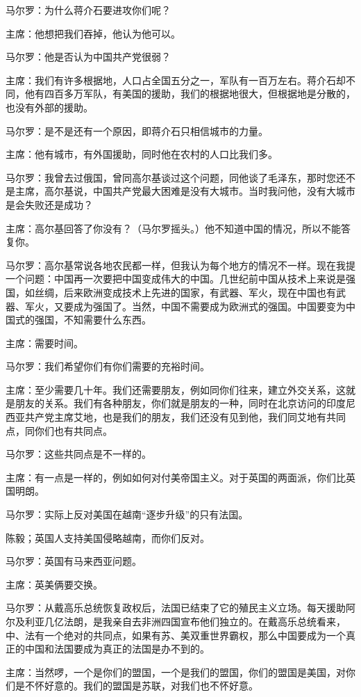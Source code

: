 马尔罗：为什么蒋介石要进攻你们呢？

主席：他想把我们吞掉，他认为他可以。

马尔罗：他是否认为中国共产党很弱？

主席：我们有许多根据地，人口占全国五分之一，军队有一百万左右。蒋介石却不同，他有四百多万军队，有美国的援助，我们的根据地很大，但根据地是分散的，也没有外部的援助。

马尔罗：是不是还有一个原因，即蒋介石只相信城市的力量。

主席：他有城市，有外国援助，同时他在农村的人口比我们多。

马尔罗：我曾去过俄国，曾同高尔基谈过这个问题，同他谈了毛泽东，那时您还不是主席，高尔基说，中国共产党最大困难是没有大城市。当时我问他，没有大城市是会失败还是成功？

主席：高尔基回答了你没有？（马尔罗摇头。）他不知道中国的情况，所以不能答复你。

马尔罗：高尔基常说各地农民都一样，但我认为每个地方的情况不一样。现在我提一个问题：中国再一次要把中国变成伟大的中国。几世纪前中国从技术上来说是强国，如丝绸，后来欧洲变成技术上先进的国家，有武器、军火，现在中国也有武器、军火，又要成为强国了。当然，中国不需要成为欧洲式的强国。中国要变为中国式的强国，不知需要什么东西。

主席：需要时间。

马尔罗：我们希望你们有你们需要的充裕时间。

主席：至少需要几十年。我们还需要朋友，例如同你们往来，建立外交关系，这就是朋友的关系。我们有各种朋友，你们就是朋友的一种，同时在北京访问的印度尼西亚共产党主席艾地，也是我们的朋友，我们还没有见到他，我们同艾地有共同点，同你们也有共同点。

马尔罗：这些共同点是不一样的。

主席：有一点是一样的，例如如何对付美帝国主义。对于英国的两面派，你们比英国明朗。

马尔罗：实际上反对美国在越南“逐步升级”的只有法国。

陈毅；英国人支持美国侵略越南，而你们反对。

马尔罗：英国有马来西亚问题。

主席：英美俩要交换。

马尔罗：从戴高乐总统恢复政权后，法国已结束了它的殖民主义立场。每天援助阿尔及利亚几亿法朗，是我亲自去非洲四国宣布他们独立的。在戴高乐总统看来，中、法有一个绝对的共同点，如果有苏、美双重世界霸权，那么中国要成为一个真正的中国和法国要成为真正的法国是办不到的。

主席：当然啰，一个是你们的盟国，一个是我们的盟国，你们的盟国是美国，对你们是不怀好意的。我们的盟国是苏联，对我们也不怀好意。

